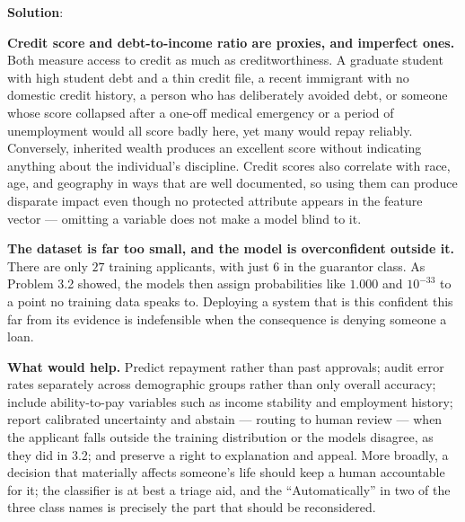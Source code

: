 \documentclass[submit]{../harvardml}
\newenvironment{solution}{
    \vspace{2mm}
    \color{blue}\noindent\textbf{Solution}:
}{}
\begin{document}
\begin{solution}
\begin{enumerate}
\noindent\textbf{Credit score and debt-to-income ratio are proxies, and imperfect
ones.} Both measure access to credit as much as creditworthiness. A graduate student
with high student debt and a thin credit file, a recent immigrant with no domestic
credit history, a person who has deliberately avoided debt, or someone whose score
collapsed after a one-off medical emergency or a period of unemployment would all score
badly here, yet many would repay reliably. Conversely, inherited wealth produces an
excellent score without indicating anything about the individual's discipline. Credit
scores also correlate with race, age, and geography in ways that are well documented,
so using them can produce disparate impact even though no protected attribute appears
in the feature vector --- omitting a variable does not make a model blind to it.

\noindent\textbf{The dataset is far too small, and the model is overconfident outside
it.} There are only $27$ training applicants, with just $6$ in the guarantor class.
As Problem 3.2 showed, the models then assign probabilities like $1.000$ and
$10^{-33}$ to a point no training data speaks to. Deploying a system that is this
confident this far from its evidence is indefensible when the consequence is denying
someone a loan.

\noindent\textbf{What would help.} Predict repayment rather than past approvals; audit
error rates separately across demographic groups rather than only overall accuracy;
include ability-to-pay variables such as income stability and employment history;
report calibrated uncertainty and abstain --- routing to human review --- when the
applicant falls outside the training distribution or the models disagree, as they did
in 3.2; and preserve a right to explanation and appeal. More broadly, a decision that
materially affects someone's life should keep a human accountable for it; the
classifier is at best a triage aid, and the ``Automatically'' in two of the three class
names is precisely the part that should be reconsidered.

\end{enumerate}
\end{solution}

\newpage
\end{document}
